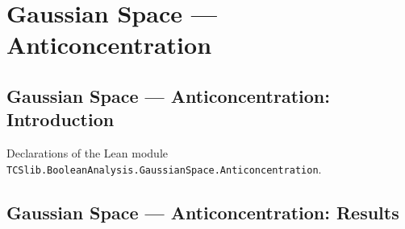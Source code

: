 \section{Gaussian Space --- Anticoncentration}
\subsection*{Gaussian Space --- Anticoncentration: Introduction}

Declarations of the Lean module \texttt{TCSlib.BooleanAnalysis.GaussianSpace.Anticoncentration}.

\subsection*{Gaussian Space --- Anticoncentration: Results}

